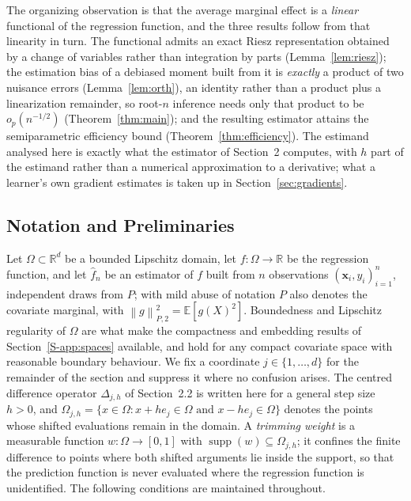 \documentclass[12pt,a4paper]{article}
\numberwithin{equation}{section}
\theoremstyle{plain}
\theoremstyle{definition}
\newcommand{\norm}[1]{\left\| #1 \right\|}
\newcommand{\R}{\mathbb{R}}
\newcommand{\E}{\mathbb{E}}
\newcommand{\fn}{\hat{f}_n}
\newcommand{\Dh}{\Delta_{j,h}}
\begin{document}
	The organizing observation is that the average marginal effect is a
	\emph{linear} functional of the regression function, and the three results
	follow from that linearity in turn. The functional admits an exact Riesz
	representation obtained by a change of variables rather than integration by
	parts (Lemma~\ref{lem:riesz}); the estimation bias of a debiased moment built
	from it is \emph{exactly} a product of two nuisance errors
	(Lemma~\ref{lem:orth}), an identity rather than a product plus a
	linearization remainder, so root-$n$ inference needs only that product to be
	$o_p(n^{-1/2})$ (Theorem~\ref{thm:main}); and the resulting estimator attains
	the semiparametric efficiency bound (Theorem~\ref{thm:efficiency}). The
	estimand analysed here is exactly what the estimator of Section~2 computes,
	with $h$ part of the estimand rather than a numerical approximation to a
	derivative; what a learner's own gradient estimates is taken up in
	Section~\ref{sec:gradients}.

	\subsection{Notation and Preliminaries}

	Let $\Omega \subset \R^d$ be a bounded Lipschitz domain, let
	$f : \Omega \to \R$ be the regression function, and let $\fn$ be an
	estimator of $f$ built from $n$ observations $(\mathbf{x}_i, y_i)_{i=1}^n$,
	independent draws from $P$; with mild abuse of notation $P$ also denotes the
	covariate marginal, with $\norm{g}_{P,2}^2 = \E[g(X)^2]$. Boundedness and
	Lipschitz regularity of $\Omega$ are what make the compactness and embedding
	results of Section~\ref{S-app:spaces} available, and hold for any compact
	covariate space with reasonable boundary behaviour. We fix a coordinate
	$j \in \{1, \dots, d\}$ for the remainder of the section and suppress it
	where no confusion arises. The centred difference operator $\Dh$ of
	Section~2.2 is written here for a general step size $h > 0$, and
	$\Omega_{j,h} = \{x \in \Omega : x + h e_j \in \Omega \text{ and }
	x - h e_j \in \Omega\}$ denotes the points whose shifted evaluations remain
	in the domain. A \emph{trimming weight} is a measurable function
	$w : \Omega \to [0,1]$ with
	$\operatorname{supp}(w) \subseteq \Omega_{j,h}$; it confines the finite
	difference to points where both shifted arguments lie inside the support, so
	that the prediction function is never evaluated where the regression function
	is unidentified. The following conditions are maintained throughout.
\end{document}
